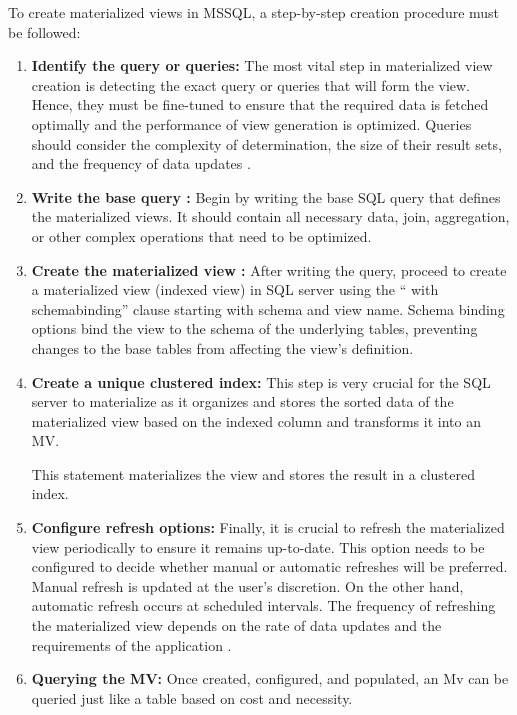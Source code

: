  To create materialized views in MSSQL, a step-by-step creation procedure must be followed:
 \begin{enumerate}
     

     \item\textbf{Identify the query or queries:} The most vital step in materialized view creation is detecting the exact query or queries that will form the view. Hence, they must be fine-tuned to ensure that the required data is fetched optimally and the performance of view generation is optimized. Queries should consider the complexity of determination, the size of their result sets, and the frequency of data updates \cite{castordoc2023}.
     
      \item\textbf{ Write the base query :} Begin by writing the base  SQL query that defines the materialized views. It should contain all necessary data, join, aggregation, or other complex operations that need to be optimized. \vspace{0.4cm}
      
      
      \item\textbf{ Create the materialized view :} After writing the query, proceed to create a materialized view (indexed view) in SQL server using the `` with schemabinding'' clause starting with schema and view name. Schema binding options bind the view to the schema of the underlying tables, preventing changes to the base tables from affecting the view's definition. %

      

      \item\textbf{ Create a unique clustered index:} This step is very crucial for the SQL server to materialize as it organizes and stores the sorted data of the materialized view based on the indexed column and transforms it into an MV. \vspace{0.4cm}
      
       

This statement materializes the view and stores the result in a clustered index.
      
      \item\textbf{ Configure refresh options:} Finally, it is crucial to refresh the materialized view periodically to ensure it remains up-to-date. This option needs to be configured to decide whether manual or automatic refreshes will be preferred. Manual refresh is updated at the user's discretion. On the other hand, automatic refresh occurs at scheduled intervals. The frequency of refreshing the materialized view depends on the rate of data updates and the requirements of the application \cite{castordoc2023}.\vspace{0.4cm}
      
      \item\textbf{ Querying the MV:} Once created, configured, and populated, an Mv can be queried just like a table based on cost and necessity.  \vspace{0.4cm}
      

\end{enumerate}

